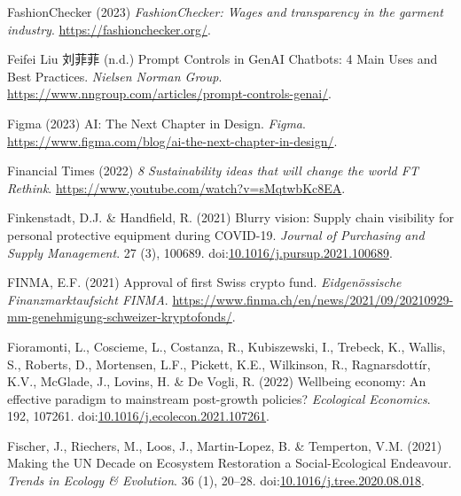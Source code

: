 \documentclass[
  letterpaper,
  DIV=11,
  numbers=noendperiod]{scrartcl}
\newlength{\cslhangindent}
\newenvironment{CSLReferences}[2] %
 {\begin{list}{}{%
  \setlength{\itemindent}{0pt}
  \setlength{\leftmargin}{0pt}
  \setlength{\parsep}{0pt}
  \ifodd #1
   \setlength{\leftmargin}{\cslhangindent}
   \setlength{\itemindent}{-1\cslhangindent}
  \fi
  \setlength{\itemsep}{#2\baselineskip}}}
 {\end{list}}
\begin{document}
\begin{CSLReferences}{0}{1}
FashionChecker (2023) \emph{{FashionChecker}: Wages and transparency in
the garment industry}. \url{https://fashionchecker.org/}.

Feifei Liu 刘菲菲 (n.d.) Prompt {Controls} in {GenAI Chatbots}: 4 {Main
Uses} and {Best Practices}. \emph{Nielsen Norman Group}.
\url{https://www.nngroup.com/articles/prompt-controls-genai/}.

Figma (2023) {AI}: {The Next Chapter} in {Design}. \emph{Figma}.
\url{https://www.figma.com/blog/ai-the-next-chapter-in-design/}.

Financial Times (2022) \emph{8 {Sustainability} ideas that will change
the world {\textbar} {FT Rethink}}.
\url{https://www.youtube.com/watch?v=sMqtwbKc8EA}.

Finkenstadt, D.J. \& Handfield, R. (2021) Blurry vision: {Supply} chain
visibility for personal protective equipment during {COVID-19}.
\emph{Journal of Purchasing and Supply Management}. 27 (3), 100689.
doi:\href{https://doi.org/10.1016/j.pursup.2021.100689}{10.1016/j.pursup.2021.100689}.

FINMA, E.F. (2021) Approval of first {Swiss} crypto fund.
\emph{Eidgen{ö}ssische Finanzmarktaufsicht FINMA}.
\url{https://www.finma.ch/en/news/2021/09/20210929-mm-genehmigung-schweizer-kryptofonds/}.

Fioramonti, L., Coscieme, L., Costanza, R., Kubiszewski, I., Trebeck,
K., Wallis, S., Roberts, D., Mortensen, L.F., Pickett, K.E., Wilkinson,
R., Ragnarsdottír, K.V., McGlade, J., Lovins, H. \& De Vogli, R. (2022)
Wellbeing economy: {An} effective paradigm to mainstream post-growth
policies? \emph{Ecological Economics}. 192, 107261.
doi:\href{https://doi.org/10.1016/j.ecolecon.2021.107261}{10.1016/j.ecolecon.2021.107261}.

Fischer, J., Riechers, M., Loos, J., Martin-Lopez, B. \& Temperton, V.M.
(2021) Making the {UN Decade} on {Ecosystem Restoration} a
{Social-Ecological Endeavour}. \emph{Trends in Ecology \& Evolution}. 36
(1), 20--28.
doi:\href{https://doi.org/10.1016/j.tree.2020.08.018}{10.1016/j.tree.2020.08.018}.


\end{CSLReferences}
\end{document}
